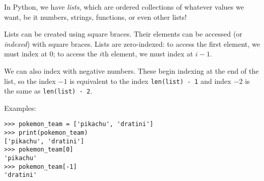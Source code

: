 In Python, we have \textit{lists}, which are ordered collections of whatever values we want, be it
numbers, strings, functions, or even other lists!

Lists can be created using square braces. Their elements can be
accessed (or \textit{indexed}) with square braces. Lists are
zero-indexed: to access the first element, we must index at 0; to access
the $i$th element, we must index at $i - 1$.

We can also index with negative numbers. These begin indexing at the
end of the list, so the index $-1$ is equivalent to the index
\texttt{len(list) - 1} and index $-2$ is the same as
\texttt{len(list) - 2}.

Examples:
\begin{lstlisting}
>>> pokemon_team = ['pikachu', 'dratini']
>>> print(pokemon_team)
['pikachu', 'dratini']
>>> pokemon_team[0]
'pikachu'
>>> pokemon_team[-1]
'dratini'
\end{lstlisting}
